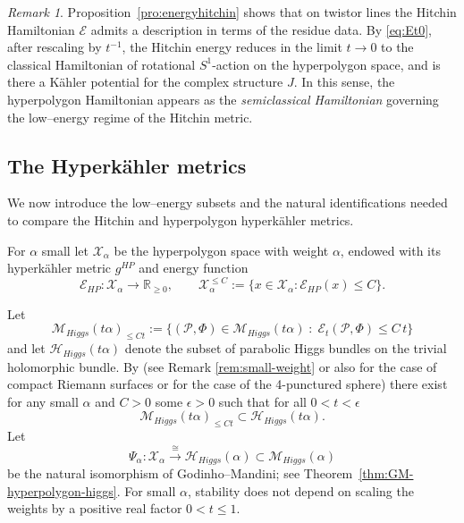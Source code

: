 \documentclass[12pt,a4paper]{amsart}
\theoremstyle{definition}
\theoremstyle{remark}
\newtheorem{remark}[theorem]{Remark}
\newcommand{\R}{\mathbb R}
\newcommand{\Pcal}{\mathcal P}
\begin{document}
\begin{remark}
Proposition~\ref{pro:energyhitchin} shows that on twistor lines 
the Hitchin Hamiltonian $\mathcal E$ admits a description in terms of the
residue data.
By \eqref{eq:Et0}, after rescaling by $t^{-1}$, the Hitchin energy reduces in the limit
$t\to0$ to the classical Hamiltonian of rotational $S^1$-action on the hyperpolygon space, and is there a K\"ahler potential for the complex structure $J$.
In this sense, the hyperpolygon Hamiltonian appears as the \emph{semiclassical
Hamiltonian} governing the low--energy regime of the Hitchin metric.
\end{remark}





\subsection{The Hyperk\"ahler metrics}

We now introduce the low--energy subsets and the natural identifications needed
to compare the Hitchin and hyperpolygon hyperk\"ahler metrics.


For $\alpha$ small let $\mathcal X_\alpha$ be the hyperpolygon space with weight $\alpha$, endowed with
its hyperk\"ahler metric $g^{HP}$ and energy function
\[
\mathcal E_{HP}\colon \mathcal X_\alpha\to\R_{\ge 0},
\qquad
\mathcal X_\alpha^{\le C}
:=
\{x\in\mathcal X_\alpha:\mathcal E_{HP}(x)\le C\}.
\]

Let \[
\mathcal M_{Higgs}(t\alpha)_{\le Ct}
:=
\bigl\{(\Pcal,\Phi)\in \mathcal M_{Higgs}(t\alpha)\;:\;
\mathcal E_t(\Pcal,\Phi)\le C\, t\bigr\}
\]
and let $\mathcal H_{Higgs}(t\alpha)$ denote the subset of parabolic Higgs bundles on the
trivial holomorphic bundle. 
By \cite{Meneses26} (see Remark \ref{rem:small-weight} or also \cite[Proposition 7.1]{Hitchin1987}
for the case of compact Riemann surfaces or \cite[Section 6.6]{HellerHellerTraizet2025}
for the case of the 4-punctured sphere) there exist for any small $\alpha$ and  $C>0$ some $\epsilon>0$ such that for all $0<t<\epsilon$
\begin{equation}\label{energy:holomorphic}
\mathcal M_{Higgs}(t\alpha)_{\le Ct}\subset\mathcal H_{Higgs}(t\alpha).\end{equation}
Let \[
\Psi_{\alpha}\colon
\mathcal X_\alpha
\xrightarrow{\;\cong\;}
\mathcal H_{Higgs}(\alpha)
\subset
\mathcal M_{Higgs}(\alpha)
\]
be the natural isomorphism of Godinho--Mandini; see
Theorem~\ref{thm:GM-hyperpolygon-higgs}.
For small $\alpha$, stability does not depend on scaling the weights by a positive real factor $0<t\leq1$.
\end{document}
